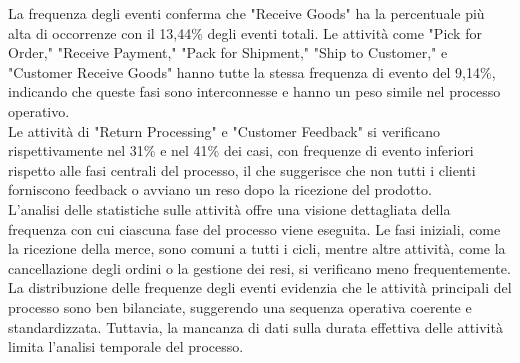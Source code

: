 \documentclass{article}
\begin{document}
La frequenza degli eventi conferma che "Receive Goods" ha la percentuale più alta di occorrenze con il 13,44\% degli eventi totali. Le attività come "Pick for Order," "Receive Payment," "Pack for Shipment," "Ship to Customer," e "Customer Receive Goods" hanno tutte la stessa frequenza di evento del 9,14\%, indicando che queste fasi sono interconnesse e hanno un peso simile nel processo operativo.\\
Le attività di "Return Processing" e "Customer Feedback" si verificano rispettivamente nel 31\% e nel 41\% dei casi, con frequenze di evento inferiori rispetto alle fasi centrali del processo, il che suggerisce che non tutti i clienti forniscono feedback o avviano un reso dopo la ricezione del prodotto.\\
L'analisi delle statistiche sulle attività offre una visione dettagliata della frequenza con cui ciascuna fase del processo viene eseguita. Le fasi iniziali, come la ricezione della merce, sono comuni a tutti i cicli, mentre altre attività, come la cancellazione degli ordini o la gestione dei resi, si verificano meno frequentemente. La distribuzione delle frequenze degli eventi evidenzia che le attività principali del processo sono ben bilanciate, suggerendo una sequenza operativa coerente e standardizzata. Tuttavia, la mancanza di dati sulla durata effettiva delle attività limita l'analisi temporale del processo.
\end{document}
